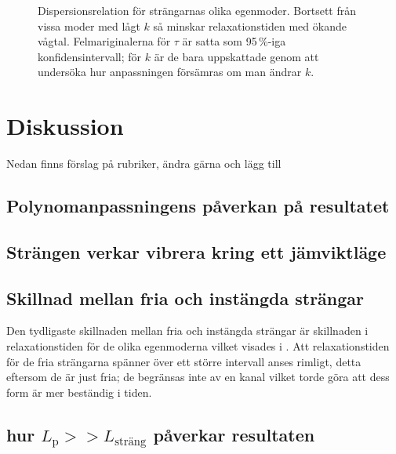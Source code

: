 \begin{figure}\centerline{
\subfigure[][]{
\label{fig:ktauconf}
}
\subfigure[][]{
\label{fig:ktaunonconf}
}}
\caption{Dispersionsrelation för strängarnas olika egenmoder. Bortsett från vissa moder med lågt $k$ så minskar relaxationstiden med ökande vågtal. Felmariginalerna för $\tau$ är satta som 95\,\%-iga konfidensintervall; för $k$ är de bara uppskattade genom att undersöka hur anpassningen försämras om man ändrar $k$.}
\label{fig:dispersion}
\end{figure}






\section{Diskussion}

Nedan finns förslag på rubriker, ändra gärna och lägg till

\subsection{Polynomanpassningens påverkan på resultatet}

\subsection{Strängen verkar vibrera kring ett jämviktläge}

\subsection{Skillnad mellan fria och instängda strängar}
Den tydligaste skillnaden mellan fria och instängda strängar är skillnaden i relaxationstiden för de olika egenmoderna vilket visades i . Att relaxationstiden för de fria strängarna spänner över ett större intervall anses rimligt, detta eftersom de är just fria; de begränsas inte av en kanal vilket torde göra att dess form är mer beständig i tiden.  



\subsection{hur $L_\text{p}>>L_\text{sträng}$ påverkar resultaten}

